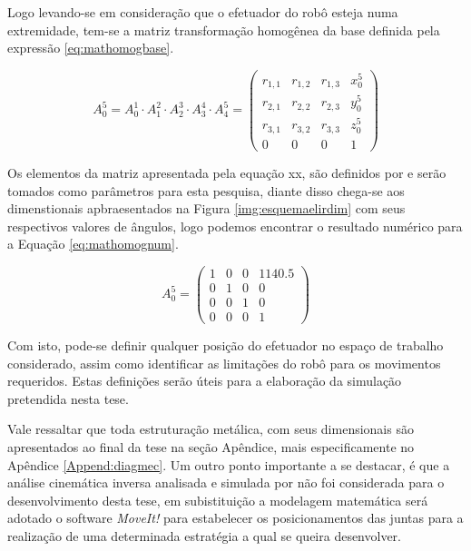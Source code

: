 Logo levando-se em consideração que o efetuador do robô esteja numa extremidade, tem-se a matriz transformação homogênea da base definida pela expressão \ref{eq:mathomogbase}.

\begin{equation}
\label{eq:mathomogbase}
	{A}_{0}^{5}={A}_{0}^{1}\cdot {A}_{1}^{2}\cdot{A}_{2}^{3}\cdot {A}_{3}^{4}\cdot{A}_{4}^{5}=\left (
	\begin{matrix}
 		{r}_{1,1} & {r}_{1,2} & {r}_{1,3} & {x}_{0}^{5} \\ 
 		{r}_{2,1} & {r}_{2,2} & {r}_{2,3} & {y}_{0}^{5} \\ 
 		{r}_{3,1} & {r}_{3,2} & {r}_{3,3} & {z}_{0}^{5} \\
 		0 & 0 & 0 & 1
	\end{matrix}
\right )		
\end{equation}
 
Os elementos da matriz apresentada pela equação xx, são definidos por  e serão tomados como parâmetros para esta pesquisa, diante disso chega-se aos dimenstionais apbraesentados na Figura \ref{img:esquemaelirdim} com seus respectivos valores de ângulos, logo podemos encontrar o resultado numérico para a Equação \ref{eq:mathomognum}.

\begin{equation}
\label{eq:mathomognum}
	{A}_{0}^{5}=\left (
	\begin{matrix}
 		1 & 0 & 0 & 1140.5 \\ 
 		0 & 1 & 0 & 0 \\ 
 		0 & 0 & 1 & 0 \\
 		0 & 0 & 0 & 1
	\end{matrix}
\right )	
\end{equation}

Com isto, pode-se definir qualquer posição do efetuador no espaço de trabalho considerado, assim como identificar as limitações do robô para os movimentos requeridos. Estas definições serão úteis para a elaboração da simulação pretendida nesta tese.

Vale ressaltar que toda estruturação metálica, com seus dimensionais são apresentados ao final da tese na seção Apêndice, mais especificamente no Apêndice \ref{Append:diagmec}. Um outro ponto importante a se destacar, é que a análise cinemática inversa analisada e simulada por  não foi considerada para o desenvolvimento desta tese, em subistituição a modelagem matemática será adotado o software \textit{MoveIt!} para estabelecer os posicionamentos das juntas para a realização de uma determinada estratégia a qual se queira desenvolver.

